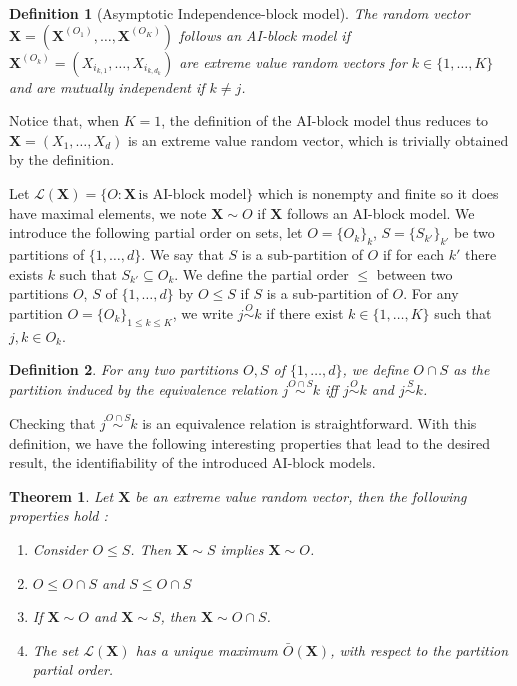 \documentclass[11pt]{article}
\newtheorem{definition}{Definition}
\newtheorem{theorem}{Theorem}
\begin{document}
	\begin{definition}[Asymptotic Independence-block model]
		 The random vector $\textbf{X} = (\textbf{X}^{(O_1)}, \dots, \textbf{X}^{(O_K)})$ follows an AI-block model if $\textbf{X}^{(O_k)} = (X_{i_{k,1}}, \dots, X_{i_{k,d_k}})$ are extreme value random vectors for $k \in \{1,\dots,K\}$ and are mutually independent if $k \neq j$.
	\end{definition}
	
	Notice that, when $K=1$, the definition of the AI-block model thus reduces to $\textbf{X} = (X_1,\dots,X_d)$ is an extreme value random vector, which is trivially obtained by the definition. 
	
	Let $\mathcal{L}(\textbf{X}) = \{O : \textbf{X} \, \textrm{is AI-block model}\}$ which is nonempty and finite so it does have maximal elements, we note $\textbf{X} \sim O$ if $\textbf{X}$ follows an AI-block model. We introduce the following partial order on sets, let $O = \{O_k\}_k$, $S = \{S_{k'}\}_{k'}$ be two partitions of $\{1,\dots,d\}$. We say that $S$ is a sub-partition of $O$ if for each $k'$ there exists $k$ such that $S_{k'} \subseteq O_k$. We define the partial order $\leq$ between two partitions $O$, $S$ of $\{1,\dots,d\}$ by $O \leq S$ if $S$ is a sub-partition of $O$. For any partition $O = \{O_k\}_{1 \leq k \leq K}$, we write $j \overset{O}{\sim} k$ if there exist $k \in \{1,\dots,K\}$ such that $j,k \in O_k$.
	
	\begin{definition}
		For any two partitions $O, S$ of $\{1,\dots,d\}$, we define $O \cap S$ as the partition induced by the equivalence relation $j \overset{O \cap S}{\sim} k$ iff $j \overset{O}{\sim} k$ and $j \overset{S}{\sim} k$.
	\end{definition}
	Checking that $j \overset{O \cap S}{\sim} k$ is an equivalence relation is straightforward. With this definition, we have the following interesting properties that lead to the desired result, the identifiability of the introduced AI-block models.
	\begin{theorem}
		\label{thm:unicity}
		Let $\textbf{X}$ be an extreme value random vector, then the following properties hold :
		\begin{enumerate}
			\item Consider $O \leq S$. Then $\textbf{X} \sim S$ implies $\textbf{X} \sim O$.
			\item $O \leq O\cap S$ and $S \leq O \cap S$
			\item If $\textbf{X} \sim O$ and $\textbf{X} \sim S$, then  $\textbf{X} \sim O \cap S$.
			\item The set $\mathcal{L}(\textbf{X})$ has a unique maximum $\bar{O}(\textbf{X})$, with respect to the partition partial order.
		\end{enumerate}
	\end{theorem}
	
\end{document}
